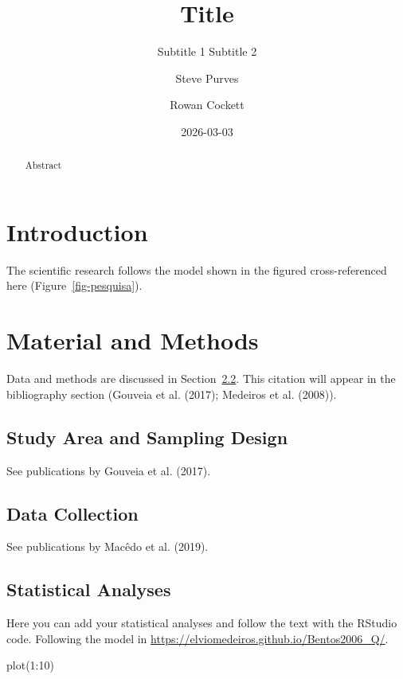 \documentclass[
  american,
  letterpaper,
  DIV=11,
  numbers=noendperiod]{scrartcl}
\title{Title}
\subtitle{Subtitle 1 Subtitle 2}
\author{Steve Purves \and Rowan Cockett}
\date{2026-03-03}
\newenvironment{Shaded}{}{}
\newcommand{\DecValTok}[1]{\textcolor[rgb]{0.25,0.63,0.44}{#1}}
\newcommand{\FunctionTok}[1]{\textcolor[rgb]{0.02,0.16,0.49}{#1}}
\newcommand{\NormalTok}[1]{#1}
\newcommand{\SpecialCharTok}[1]{\textcolor[rgb]{0.25,0.44,0.63}{#1}}
\renewcommand*\contentsname{Table of contents}
\newcommand\contentsname{Table of contents}
\begin{document}
\maketitle
\begin{abstract}
Abstract
\end{abstract}

\renewcommand*\contentsname{Table of contents}
{
\setcounter{tocdepth}{3}
\tableofcontents
}
\listoffigures
\listoftables

\section{Introduction}\label{introduction}

The scientific research follows the model shown in the figured
cross-referenced here (Figure~\ref{fig-pesquisa}).

\section{Material and Methods}\label{material-and-methods}

Data and methods are discussed in Section~\ref{sec-data-col}. This
citation will appear in the bibliography section (Gouveia et al. (2017);
Medeiros et al. (2008)).

\subsection{Study Area and Sampling
Design}\label{study-area-and-sampling-design}

See publications by Gouveia et al. (2017).

\subsection{Data Collection}\label{sec-data-col}

See publications by Macêdo et al. (2019).

\subsection{Statistical Analyses}\label{statistical-analyses}

Here you can add your statistical analyses and follow the text with the
RStudio code. Following the model in
\url{https://elviomedeiros.github.io/Bentos2006_Q/}.

\begin{Shaded}
\begin{Highlighting}[numbers=left,,]
\FunctionTok{plot}\NormalTok{(}\DecValTok{1}\SpecialCharTok{:}\DecValTok{10}\NormalTok{)}
\end{Highlighting}
\end{Shaded}
\end{document}
